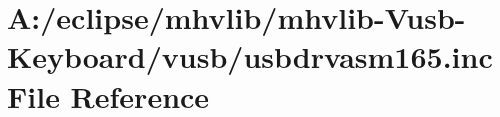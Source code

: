 \hypertarget{mhvlib-_vusb-_keyboard_2vusb_2usbdrvasm165_8inc}{\section{A\-:/eclipse/mhvlib/mhvlib-\/\-Vusb-\/\-Keyboard/vusb/usbdrvasm165.inc File Reference}
\label{mhvlib-_vusb-_keyboard_2vusb_2usbdrvasm165_8inc}
}

